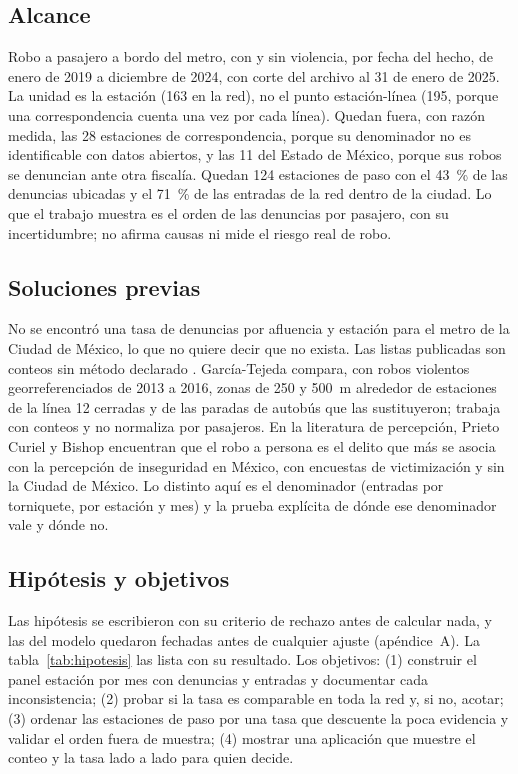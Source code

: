 \documentclass[conference]{IEEEtran}
\begin{document}
\subsection{Alcance}

Robo a pasajero a bordo del metro, con y sin violencia, por fecha del hecho, de enero de 2019 a diciembre de 2024, con corte del archivo al 31 de enero de 2025. La unidad es la estación (163 en la red), no el punto estación-línea (195, porque una correspondencia cuenta una vez por cada línea). Quedan fuera, con razón medida, las 28 estaciones de correspondencia, porque su denominador no es identificable con datos abiertos, y las 11 del Estado de México, porque sus robos se denuncian ante otra fiscalía. Quedan 124 estaciones de paso con el 43~\% de las denuncias ubicadas y el 71~\% de las entradas de la red dentro de la ciudad. Lo que el trabajo muestra es el orden de las denuncias por pasajero, con su incertidumbre; no afirma causas ni mide el riesgo real de robo.

\subsection{Soluciones previas}

No se encontró una tasa de denuncias por afluencia y estación para el metro de la Ciudad de México, lo que no quiere decir que no exista. Las listas publicadas son conteos sin método declarado \cite{infobae2024,expansion2024,nmas2023}. García-Tejeda \cite{garciatejeda2023} compara, con robos violentos georreferenciados de 2013 a 2016, zonas de 250 y 500~m alrededor de estaciones de la línea 12 cerradas y de las paradas de autobús que las sustituyeron; trabaja con conteos y no normaliza por pasajeros. En la literatura de percepción, Prieto Curiel y Bishop \cite{prietocuriel2016} encuentran que el robo a persona es el delito que más se asocia con la percepción de inseguridad en México, con encuestas de victimización y sin la Ciudad de México. Lo distinto aquí es el denominador (entradas por torniquete, por estación y mes) y la prueba explícita de dónde ese denominador vale y dónde no.

\subsection{Hipótesis y objetivos}

Las hipótesis se escribieron con su criterio de rechazo antes de calcular nada, y las del modelo quedaron fechadas antes de cualquier ajuste (apéndice~A). La tabla~\ref{tab:hipotesis} las lista con su resultado. Los objetivos: (1) construir el panel estación por mes con denuncias y entradas y documentar cada inconsistencia; (2) probar si la tasa es comparable en toda la red y, si no, acotar; (3) ordenar las estaciones de paso por una tasa que descuente la poca evidencia y validar el orden fuera de muestra; (4) mostrar una aplicación que muestre el conteo y la tasa lado a lado para quien decide.
\end{document}
